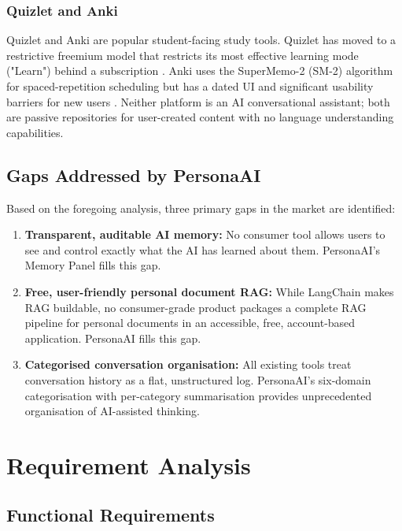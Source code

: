 \documentclass[12pt,a4paper]{report}
\begin{document}
\subsection{Quizlet and Anki}
Quizlet and Anki are popular student-facing study tools. Quizlet has moved to a restrictive freemium model that restricts its most effective learning mode ("Learn") behind a subscription \cite{quizlet}. Anki uses the SuperMemo-2 (SM-2) algorithm for spaced-repetition scheduling but has a dated UI and significant usability barriers for new users \cite{anki}. Neither platform is an AI conversational assistant; both are passive repositories for user-created content with no language understanding capabilities.

\section{Gaps Addressed by PersonaAI}

Based on the foregoing analysis, three primary gaps in the market are identified:

\begin{enumerate}
  \item \textbf{Transparent, auditable AI memory:} No consumer tool allows users to see and control exactly what the AI has learned about them. PersonaAI's Memory Panel fills this gap.
  \item \textbf{Free, user-friendly personal document RAG:} While LangChain makes RAG buildable, no consumer-grade product packages a complete RAG pipeline for personal documents in an accessible, free, account-based application. PersonaAI fills this gap.
  \item \textbf{Categorised conversation organisation:} All existing tools treat conversation history as a flat, unstructured log. PersonaAI's six-domain categorisation with per-category summarisation provides unprecedented organisation of AI-assisted thinking.
\end{enumerate}

\chapter{Requirement Analysis}

\section{Functional Requirements}
\end{document}
